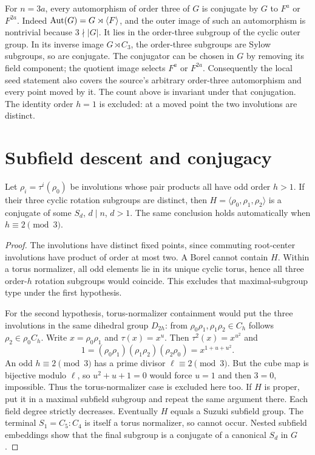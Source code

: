 \documentclass[11pt,a4paper]{article}
\begin{document}
For $n=3a$, every automorphism of order three of $G$ is conjugate by $G$ to $F^a$ or
$F^{2a}$. Indeed $\operatorname{Aut}(G)=G\rtimes\langle F\rangle$, and the outer image of such an
automorphism is nontrivial because $3\nmid|G|$. It lies in the order-three
subgroup of the cyclic outer group. In its inverse image
$G\rtimes C_3$, the order-three subgroups are Sylow subgroups, so are
conjugate. The conjugator can be chosen in $G$ by removing its field
component; the quotient image selects $F^a$ or $F^{2a}$. Consequently
the local seed statement also covers the source's arbitrary order-three
automorphism and every point moved by it. The count above is invariant
under that conjugation. The identity order $h=1$ is excluded: at a moved
point the two involutions are distinct.

\section{Subfield descent and conjugacy}
\begin{lemma}\label{descent}
Let $\rho_i=\tau^i(\rho_0)$ be involutions whose pair products all have
odd order $h>1$. If their three cyclic rotation subgroups are distinct,
then $H=\langle\rho_0,\rho_1,\rho_2\rangle$ is a conjugate of some
$S_d$, $d\mid n$, $d>1$. The same conclusion holds automatically when
$h\equiv2\pmod3$.
\end{lemma}
\begin{proof}
The involutions have distinct fixed points, since commuting root-center
involutions have product of order at most two. A Borel cannot contain
$H$. Within a torus normalizer, all odd elements lie in its unique cyclic
torus, hence all three order-$h$ rotation subgroups would coincide.
This excludes that maximal-subgroup type under the first hypothesis.

For the second hypothesis, torus-normalizer containment would put the
three involutions in the same dihedral group $D_{2h}$: from
$\rho_0\rho_1,\rho_1\rho_2\in C_h$ follows $\rho_2\in\rho_0C_h$.
Write $x=\rho_0\rho_1$ and $\tau(x)=x^u$. Then
$\tau^2(x)=x^{u^2}$ and
\[
 1=(\rho_0\rho_1)(\rho_1\rho_2)(\rho_2\rho_0)
   =x^{1+u+u^2}.
\]
An odd $h\equiv2\pmod3$ has a prime divisor $\ell\equiv2\pmod3$.
But the cube map is bijective modulo $\ell$, so
$u^2+u+1=0$ would force $u=1$ and then $3=0$, impossible.
Thus the torus-normalizer case is excluded here too.
If $H$ is proper, put it in a maximal subfield subgroup and repeat the
same argument there. Each field degree strictly decreases. Eventually
$H$ equals a Suzuki subfield group. The terminal $S_1=C_5:C_4$ is itself
a torus normalizer, so cannot occur. Nested subfield embeddings show that
the final subgroup is a conjugate of a canonical $S_d$ in $G$.
\end{proof}
\end{document}
